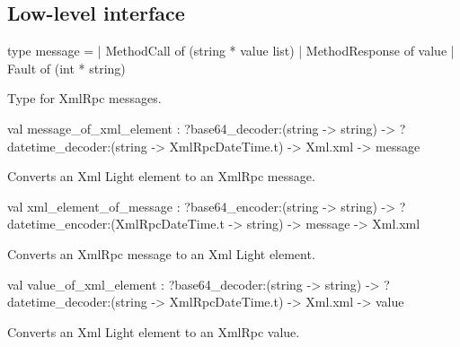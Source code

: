 \documentclass[11pt]{article}
\begin{document}
\subsection{Low-level interface}




\label{type:XmlRpc.message}\begin{ocamldoccode}
type message =
  | MethodCall of (string * value list)
  | MethodResponse of value
  | Fault of (int * string)
\end{ocamldoccode}
\begin{ocamldocdescription}
Type for XmlRpc messages.


\end{ocamldocdescription}




\label{val:XmlRpc.message-underscoreof-underscorexml-underscoreelement}\begin{ocamldoccode}
val message_of_xml_element :
  ?base64_decoder:(string -> string) ->
  ?datetime_decoder:(string -> XmlRpcDateTime.t) -> Xml.xml -> message
\end{ocamldoccode}
\begin{ocamldocdescription}
Converts an Xml Light element to an XmlRpc message.


\end{ocamldocdescription}




\label{val:XmlRpc.xml-underscoreelement-underscoreof-underscoremessage}\begin{ocamldoccode}
val xml_element_of_message :
  ?base64_encoder:(string -> string) ->
  ?datetime_encoder:(XmlRpcDateTime.t -> string) -> message -> Xml.xml
\end{ocamldoccode}
\begin{ocamldocdescription}
Converts an XmlRpc message to an Xml Light element.


\end{ocamldocdescription}




\label{val:XmlRpc.value-underscoreof-underscorexml-underscoreelement}\begin{ocamldoccode}
val value_of_xml_element :
  ?base64_decoder:(string -> string) ->
  ?datetime_decoder:(string -> XmlRpcDateTime.t) -> Xml.xml -> value
\end{ocamldoccode}
\begin{ocamldocdescription}
Converts an Xml Light element to an XmlRpc value.


\end{ocamldocdescription}
\end{document}
